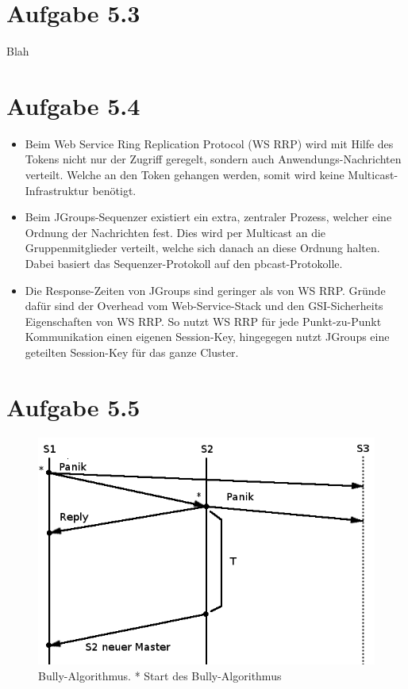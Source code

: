 \documentclass[german,12pt,a4paper]{article}
\begin{document}
\section*{Aufgabe 5.3}

Blah

\section*{Aufgabe 5.4}

\begin{itemize}

\begin{itemize}

	\item Beim Web Service Ring Replication Protocol (WS RRP) wird mit Hilfe des Tokens nicht nur
		der Zugriff geregelt, sondern auch Anwendungs-Nachrichten verteilt. Welche an den Token gehangen
		werden, somit wird keine Multicast-Infrastruktur benötigt.

	\item Beim JGroups-Sequenzer existiert ein extra, zentraler Prozess, welcher eine Ordnung der
		Nachrichten fest. Dies wird per Multicast an die Gruppenmitglieder verteilt, welche sich
		danach an diese Ordnung halten. Dabei basiert das Sequenzer-Protokoll auf den
		pbcast-Protokolle.

	\item Die Response-Zeiten von JGroups sind geringer als von WS RRP. Gründe dafür sind der
		Overhead vom Web-Service-Stack und den GSI-Sicherheits Eigenschaften von WS RRP. So nutzt WS
		RRP für jede Punkt-zu-Punkt Kommunikation einen eigenen Session-Key, hingegegen nutzt
		JGroups eine geteilten Session-Key für das ganze Cluster.

\end{itemize}

\end{itemize}

\section*{Aufgabe 5.5}

\begin{figure}[h!]
  \centering
  \includegraphics[width=1\textwidth]{bully1.png}
  \caption{Bully-Algorithmus. * Start des Bully-Algorithmus}
\end{figure}
\end{document}
